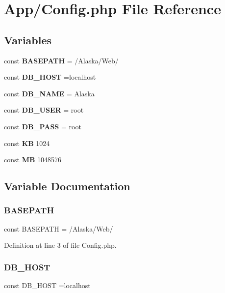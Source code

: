 \section{App/\+Config.php File Reference}
\label{_config_8php}
\subsection*{Variables}
\begin{DoxyCompactItemize}
\item 
const \textbf{ B\+A\+S\+E\+P\+A\+TH} = \textquotesingle{}/Alaska/Web/\textquotesingle{}
\item 
const \textbf{ D\+B\+\_\+\+H\+O\+ST} =\textquotesingle{}localhost\textquotesingle{}
\item 
const \textbf{ D\+B\+\_\+\+N\+A\+ME} = \textquotesingle{}Alaska\textquotesingle{}
\item 
const \textbf{ D\+B\+\_\+\+U\+S\+ER} = \textquotesingle{}root\textquotesingle{}
\item 
const \textbf{ D\+B\+\_\+\+P\+A\+SS} = \textquotesingle{}root\textquotesingle{}
\item 
const \textbf{ KB} 1024
\item 
const \textbf{ MB} 1048576
\end{DoxyCompactItemize}


\subsection{Variable Documentation}
\mbox{\label{_config_8php_ad39801cabfd338dc5524466fe793fda9}} 
\subsubsection{B\+A\+S\+E\+P\+A\+TH}
{\footnotesize\ttfamily const B\+A\+S\+E\+P\+A\+TH = \textquotesingle{}/Alaska/Web/\textquotesingle{}}



Definition at line 3 of file Config.\+php.

\mbox{\label{_config_8php_a293363d7988627f671958e2d908c202a}} 
\subsubsection{D\+B\+\_\+\+H\+O\+ST}
{\footnotesize\ttfamily const D\+B\+\_\+\+H\+O\+ST =\textquotesingle{}localhost\textquotesingle{}}



